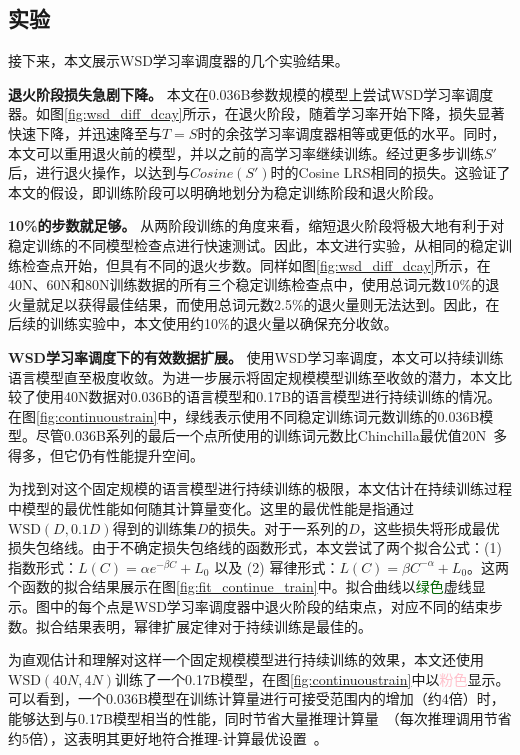 \subsection{实验}
\label{sec:wsd_experiments_continoustrain}
接下来，本文展示WSD学习率调度器的几个实验结果。

\textbf{退火阶段损失急剧下降。} 本文在0.036B参数规模的模型上尝试WSD学习率调度器。如图\ref{fig:wsd_diff_dcay}所示，在退火阶段，随着学习率开始下降，损失显著快速下降，并迅速降至与$T = S$时的余弦学习率调度器相等或更低的水平。同时，本文可以重用退火前的模型，并以之前的高学习率继续训练。经过更多步训练$S'$后，进行退火操作，以达到与$Cosine(S')$时的Cosine LRS相同的损失。这验证了本文的假设，即训练阶段可以明确地划分为稳定训练阶段和退火阶段。

\textbf{10\%的步数就足够。} 从两阶段训练的角度来看，缩短退火阶段将极大地有利于对稳定训练的不同模型检查点进行快速测试。因此，本文进行实验，从相同的稳定训练检查点开始，但具有不同的退火步数。同样如图\ref{fig:wsd_diff_dcay}所示，在40N、60N和80N训练数据的所有三个稳定训练检查点中，使用总词元数10\%的退火量就足以获得最佳结果，而使用总词元数2.5\%的退火量则无法达到。因此，在后续的训练实验中，本文使用约10\%的退火量以确保充分收敛。

\textbf{WSD学习率调度下的有效数据扩展。} 使用WSD学习率调度，本文可以持续训练语言模型直至极度收敛。为进一步展示将固定规模模型训练至收敛的潜力，本文比较了使用40N数据对0.036B的语言模型和0.17B的语言模型进行持续训练的情况。
在图\ref{fig:continuoustrain}中，绿线表示使用不同稳定训练词元数训练的0.036B模型。尽管0.036B系列的最后一个点所使用的训练词元数比Chinchilla最优值20N~\citep{hoffmann2022training}多得多，但它仍有性能提升空间。


为找到对这个固定规模的语言模型进行持续训练的极限，本文估计在持续训练过程中模型的最优性能如何随其计算量变化。这里的最优性能是指通过$\text{WSD}(D, 0.1D)$得到的训练集$D$的损失。对于一系列的$D$，这些损失将形成最优损失包络线。由于不确定损失包络线的函数形式，本文尝试了两个拟合公式：(1) 指数形式：$L(C) = \alpha e^{-\beta C} + L_0$ 以及 (2) 幂律形式：$L(C) = \beta C^{-\alpha} + L_0$。这两个函数的拟合结果展示在图\ref{fig:fit_continue_train}中。拟合曲线以\textcolor{darkgreen}{绿色}虚线显示。图中的每个点是WSD学习率调度器中退火阶段的结束点，对应不同的结束步数。拟合结果表明，幂律扩展定律对于持续训练是最佳的。 





为直观估计和理解对这样一个固定规模模型进行持续训练的效果，本文还使用$\text{WSD}(40N, 4N)$训练了一个0.17B模型，在图\ref{fig:continuoustrain}中以\textcolor{pink}{粉色}显示。可以看到，一个0.036B模型在训练计算量进行可接受范围内的增加（约4倍）时，能够达到与0.17B模型相当的性能，同时节省大量推理计算量~\citep{sardana2023beyond}（每次推理调用节省约5倍），这表明其更好地符合推理-计算最优设置~\citep{sardana2023beyond}。 


